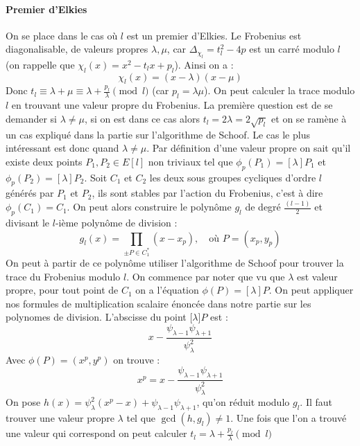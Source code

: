 \documentclass[12pt]{article}
\begin{document}
\paragraph*{Premier d'Elkies}
On se place dans le cas où $l$ est un premier d'Elkies. Le Frobenius est diagonalisable, de valeurs propres $\lambda, \mu$, car $\Delta_{\chi_l} =t_l^2 -4p$ est un carré modulo $l$ (on rappelle que $\chi_{l}(x) = x^2 - t_lx +p_l$). Ainsi on a :
\begin{equation*}
\chi_l(x) = (x - \lambda)(x- \mu)
\end{equation*}
Donc $t_l \equiv \lambda +\mu \equiv \lambda + \frac{p_l}{\lambda} \pmod l$ (car $p_l = \lambda\mu$). On peut calculer la trace modulo $l$ en trouvant une valeur propre du Frobenius. La première question est de se demander si $\lambda \ne \mu$, si on est dans ce cas alors $t_l = 2 \lambda = 2 \sqrt{p_l}$ et on se ramène à un cas expliqué dans la partie sur l'algorithme de Schoof. Le cas le plus intéressant est donc quand $\lambda \ne \mu$. Par définition d'une valeur propre on sait qu'il existe deux points $P_1,P_2 \in E[l]$ non triviaux tel que $\phi_p(P_1) = [\lambda]P_1$ et $\phi_p(P_2) = [\lambda]P_2$. Soit $C_1$ et $C_2$ les deux sous groupes cycliques d'ordre $l$ générés par $P_1$ et $P_2$, ils sont stables par l'action du Frobenius, c'est à dire $\phi_p(C_1) = C_1$. On peut alors construire le polynôme $g_l$ de degré $\frac{(l-1)}{2}$ et divisant le $l$-ième polynôme de division : 
\begin{equation}
\label{poly g_l}
g_l(x) = \prod_{\pm P \in C_1^*} (x - x_p), \quad \text{où } P = (x_p, y_p)
\end{equation}
On peut à partir de ce polynôme utiliser l'algorithme de Schoof pour trouver la trace du Frobenius modulo $l$. On commence par noter que vu que $\lambda$ est valeur propre, pour tout point de $C_1$  on a l'équation $\phi(P) = [\lambda]P$. On peut appliquer nos formules de multiplication scalaire énoncée dans notre partie sur les polynomes de division. L'abscisse du point [$\lambda$]$P$ est : 
\begin{equation*}
x - \frac{\psi_{\lambda-1}\psi_{\lambda+1}}{\psi_{\lambda}^2}
\end{equation*}
Avec $\phi(P)=(x^p,y^p)$ on trouve :
\begin{equation*}
x^p = x - \frac{\psi_{\lambda-1}\psi_{\lambda+1}}{\psi_{\lambda}^2}
\end{equation*}
On pose $h(x) = \psi_{\lambda}^2(x^p-x) + \psi_{\lambda-1}\psi_{\lambda+1}$, qu'on réduit modulo $g_l$. Il faut trouver une valeur propre $\lambda$ tel que $\gcd(h,g_l) \ne 1$. Une fois que l'on a trouvé une valeur qui correspond on peut calculer $t_l = \lambda + \frac{p_l}{\lambda} \pmod l$
\end{document}
